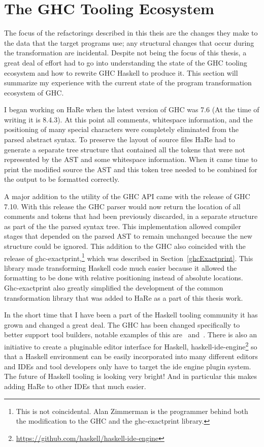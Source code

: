\section{The GHC Tooling Ecosystem}

The focus of the refactorings described in this theis are the changes they make to the data that the target programs use; any structural changes that occur during the transformation are incidental. Despite not being the focus of this thesis, a great deal of effort had to go into understanding the state of the GHC tooling ecosystem and how to rewrite GHC Haskell to produce it. This section will summarize my experience with the current state of the program transformation ecosystem of GHC.

I began working on HaRe when the latest version of GHC was 7.6 (At the time of writing it is 8.4.3). At this point all comments, whitespace information, and the positioning of many special characters were completely eliminated from the parsed abstract syntax. To preserve the layout of source files HaRe had to generate a separate tree structure that contained all the tokens that were not represented by the AST and some whitespace information. When it came time to print the modified source the AST and this token tree needed to be combined for the output to be formatted correctly. 

A major addition to the utility of the GHC API came with the release of GHC 7.10. With this release the GHC parser would now return the location of all comments and tokens that had been previously discarded, in a separate structure as part of the the parsed syntax tree. This implementation allowed compiler stages that depended on the parsed AST to remain unchanged because the new structure could be ignored. This addition to the GHC also coincided with the release of ghc-exactprint,\footnote{This is not coincidental. Alan Zimmerman is the programmer behind both the modification to the GHC and the ghc-exactprint library.} which was described in Section~\ref{ghcExactprint}. This library made transforming Haskell code much easier because it allowed the formatting to be done with relative positioning instead of absolute locations. Ghc-exactprint also greatly simplified the development of the common transformation library that was added to HaRe as a part of this thesis work. 

In the short time that I have been a part of the Haskell tooling community it has grown and changed a great deal. The GHC has been changed specifically to better support tool builders, notable examples of this are~\cite{apiAnns} and~\cite{treesThatGrow}. There is also an initiative to create a pluginable editor interface for Haskell, haskell-ide-engine\footnote{\url{https://github.com/haskell/haskell-ide-engine}} so that a Haskell environment can be easily incorporated into many different editors and IDEs and tool developers only have to target the ide engine plugin system. The future of Haskell tooling is looking very bright! And in particular this makes adding HaRe to other IDEs that much easier. 

